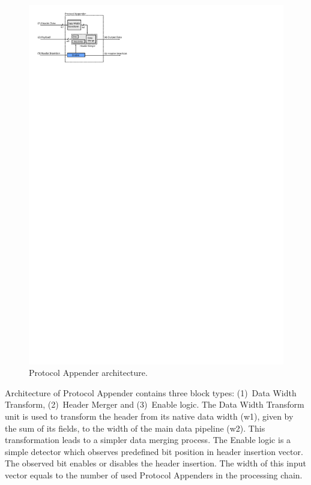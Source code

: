 \begin{figure}[ht]
    \centering
    \includegraphics[scale=1.27]{chapters/pic/ProtocolAppender}
    \caption{Protocol Appender architecture.}
    \label{fig:protocolAppender}
\end{figure}

Architecture of Protocol Appender contains three block types: (1)~Data Width Transform, (2)~Header Merger and (3)~Enable logic.
The Data Width Transform unit is used to transform the header from its native data width (w1), given by the sum of its fields, to the width of 
the main data pipeline (w2).
This transformation leads to a simpler data merging process. The Enable logic is a simple detector which observes predefined 
bit position in header insertion vector. The observed bit enables or disables the header insertion. 
The width of this input vector equals to the number of used Protocol Appenders in the processing chain. 

